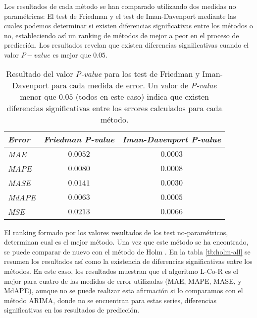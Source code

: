 \documentclass[runningheads]{llncs}
\begin{document}
Los resultados de cada método se han comparado utilizando dos medidas no paramétricas: El test de
Friedman y el test de Iman-Davenport mediante las cuales podemos determinar si existen diferencias
significativas entre los métodos o no, estableciendo así un ranking de métodos de mejor a peor en
el proceso de predicción. Los resultados revelan que existen diferencias significativas cuando el
valor $P-value$ es mejor que $0.05$. 



\begin{table} \footnotesize
 \begin{center}
 \begin{tabular}{|l|c|c|}
\hline
\emph{Error} & \emph{Friedman P-value} & \emph{Iman-Davenport P-value} \\
\hline
\emph{MAE} & $0.0052$ & $0.0003$ \\
\emph{MAPE} & $0.0080$ & $0.0008$ \\
\emph{MASE} & $0.0141$ & $0.0030$ \\
\emph{MdAPE} & $0.0063$ & $0.0005$ \\
\emph{MSE} & $0.0213$ & $0.0066$ \\
\hline

 \end{tabular}
 \end{center}
 \caption{Resultado del valor \emph{P-value} para los test de Friedman y Iman-Davenport
para cada medida de error. Un valor de \emph{P-value} menor que $0.05$ (todos en este caso)
indica que existen diferencias significativas entre los errores calculados para cada
método.
 \label{tb:friedman-iman-tests}}
 \end{table}

El ranking formado por los valores resultados de los test no-paramétricos, determinan cual es el
mejor método. Una vez que este método se ha encontrado, se puede comparar de nuevo con el método de
Holm \cite{Holm1979}. En la tabla \ref{tb:holm-all} se resumen los resultados así como la
existencia de diferencias significativas entre los métodos. En este caso, los resultados muestran
que el algoritmo L-Co-R es el mejor para cuatro de las medidas de error utilizadas (MAE, MAPE,
MASE, y MdAPE), aunque no se puede realizar esta afirmación si lo comparamos con el método ARIMA,
donde no se encuentran para estas series, diferencias significativas en los resultados de
predicción.  
\end{document}
